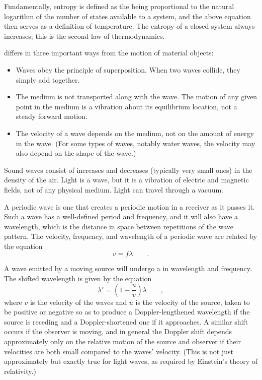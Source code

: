 	Fundamentally, entropy is defined as the being proportional
	to the natural logarithm of the number of states available
	to a system, and the above equation then serves as a
	definition of temperature. The entropy of a closed
	system always increases; this is the second law of thermodynamics.


	 differs in three important ways from the motion
	of material objects:
	
	\begin{itemize}
	\item[] Waves obey the principle of superposition. When two
	waves collide, they simply add together.
	
	\item[] The medium is not transported along with the wave. The
	motion of any given point in the medium is a vibration about
	its equilibrium location, not a steady forward motion.
	
	\item[] The velocity of a wave depends on the medium, not on the
	amount of energy in the wave. (For some types of waves,
	notably water waves, the velocity may also depend on
	the shape of the wave.)
	\end{itemize}
	
	Sound waves consist of increases and decreases (typically
	very small ones) in the density of the air. Light is a wave,
	but it is a vibration of electric and magnetic fields, not
	of any physical medium. Light can travel through a vacuum.
	
	A periodic wave is one that creates a periodic motion in a
	receiver as it passes it. Such a wave has a well-defined
	period and frequency, and it will also have a wavelength,
	which is the distance in space between repetitions of the
	wave pattern. The velocity, frequency, and wavelength of a
	periodic wave are related by the equation
	\begin{equation*}
			v  =  f \lambda \qquad .  
	\end{equation*}
	
	A wave emitted by a moving source will undergo a  in
	wavelength and frequency. The shifted wavelength is
	given by the equation
	\begin{equation*}
		   \lambda' = \left(1-\frac{u}{v}\right)\lambda \qquad   ,
	\end{equation*}
	where $v$ is the velocity of the waves and $u$ is the
	velocity of the source, taken to be positive or negative so
	as to produce a Doppler-lengthened wavelength if  the source
	is receding and a Doppler-shortened one if it approaches. A
	similar shift occurs if the observer is moving, and in
	general the Doppler shift depends approximately only on the
	relative motion of the source and observer if their
	velocities are both small compared to the waves' velocity.
	(This is not just approximately but exactly true for light
	waves, as required by Einstein's
	theory of relativity.)

